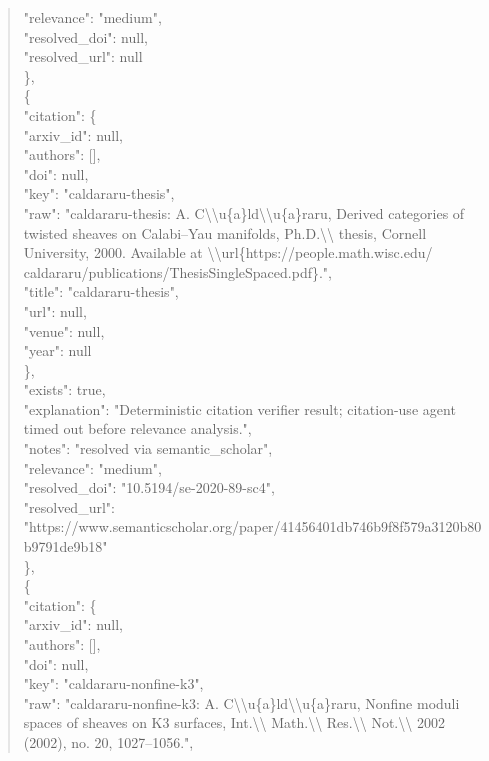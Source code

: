 \documentclass[11pt]{article}
\begin{document}
\begin{quote}
      "relevance": "medium",\\
      "resolved\_doi": null,\\
      "resolved\_url": null\\
    \},\\
    \{\\
      "citation": \{\\
        "arxiv\_id": null,\\
        "authors": [],\\
        "doi": null,\\
        "key": "caldararu-thesis",\\
        "raw": "caldararu-thesis: A. C\textbackslash{}\textbackslash{}u\{a\}ld\textbackslash{}\textbackslash{}u\{a\}raru, Derived categories of twisted sheaves on Calabi--Yau manifolds, Ph.D.\textbackslash{}\textbackslash{} thesis, Cornell University, 2000. Available at \textbackslash{}\textbackslash{}url\{https://people.math.wisc.edu/ caldararu/publications/ThesisSingleSpaced.pdf\}.",\\
        "title": "caldararu-thesis",\\
        "url": null,\\
        "venue": null,\\
        "year": null\\
      \},\\
      "exists": true,\\
      "explanation": "Deterministic citation verifier result; citation-use agent timed out before relevance analysis.",\\
      "notes": "resolved via semantic\_scholar",\\
      "relevance": "medium",\\
      "resolved\_doi": "10.5194/se-2020-89-sc4",\\
      "resolved\_url": "https://www.semanticscholar.org/paper/41456401db746b9f8f579a3120b80b9791de9b18"\\
    \},\\
    \{\\
      "citation": \{\\
        "arxiv\_id": null,\\
        "authors": [],\\
        "doi": null,\\
        "key": "caldararu-nonfine-k3",\\
        "raw": "caldararu-nonfine-k3: A. C\textbackslash{}\textbackslash{}u\{a\}ld\textbackslash{}\textbackslash{}u\{a\}raru, Nonfine moduli spaces of sheaves on K3 surfaces, Int.\textbackslash{}\textbackslash{} Math.\textbackslash{}\textbackslash{} Res.\textbackslash{}\textbackslash{} Not.\textbackslash{}\textbackslash{} 2002 (2002), no. 20, 1027--1056.",\\

\end{quote}
\end{document}
